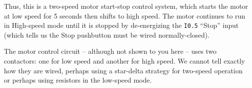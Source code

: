 \vskip 10pt

Thus, this is a two-speed motor start-stop control system, which starts the motor at low speed for 5 seconds then shifts to high speed.  The motor continues to run in High-speed mode until it is stopped by de-energizing the {\tt I0.5} ``Stop'' input (which tells us the Stop pushbutton must be wired normally-closed).  

The motor control circuit -- although not shown to you here -- uses two contactors: one for low speed and another for high speed.  We cannot tell exactly how they are wired, perhaps using a star-delta strategy for two-speed operation or perhaps using resistors in the low-speed mode.





